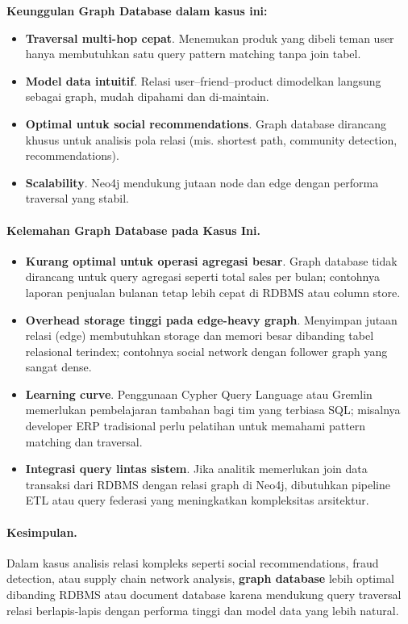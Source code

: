 \textbf{Keunggulan Graph Database dalam kasus ini:}
\begin{itemize}
	\item \textbf{Traversal multi-hop cepat}. Menemukan produk yang dibeli teman user hanya membutuhkan satu query pattern matching tanpa join tabel.
	\item \textbf{Model data intuitif}. Relasi user–friend–product dimodelkan langsung sebagai graph, mudah dipahami dan di-maintain.
	\item \textbf{Optimal untuk social recommendations}. Graph database dirancang khusus untuk analisis pola relasi (mis. shortest path, community detection, recommendations).
	\item \textbf{Scalability}. Neo4j mendukung jutaan node dan edge dengan performa traversal yang stabil.
\end{itemize}

\paragraph{Kelemahan Graph Database pada Kasus Ini.}
\begin{itemize}
	\item \textbf{Kurang optimal untuk operasi agregasi besar}. Graph database tidak dirancang untuk query agregasi seperti total sales per bulan; contohnya laporan penjualan bulanan tetap lebih cepat di RDBMS atau column store.
	
	\item \textbf{Overhead storage tinggi pada edge-heavy graph}. Menyimpan jutaan relasi (edge) membutuhkan storage dan memori besar dibanding tabel relasional terindex; contohnya social network dengan follower graph yang sangat dense.
	
	\item \textbf{Learning curve}. Penggunaan Cypher Query Language atau Gremlin memerlukan pembelajaran tambahan bagi tim yang terbiasa SQL; misalnya developer ERP tradisional perlu pelatihan untuk memahami pattern matching dan traversal.
	
	\item \textbf{Integrasi query lintas sistem}. Jika analitik memerlukan join data transaksi dari RDBMS dengan relasi graph di Neo4j, dibutuhkan pipeline ETL atau query federasi yang meningkatkan kompleksitas arsitektur.
\end{itemize}

\paragraph{Kesimpulan.}
Dalam kasus analisis relasi kompleks seperti social recommendations, fraud detection, atau supply chain network analysis, \textbf{graph database} lebih optimal dibanding RDBMS atau document database karena mendukung query traversal relasi berlapis-lapis dengan performa tinggi dan model data yang lebih natural.


